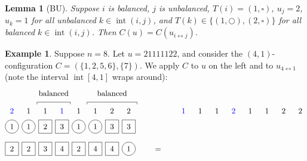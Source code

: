 \documentclass[submission]{FPSAC2018}
\DeclareMathOperator{\inter}{int} %
\theoremstyle{plain}
\newtheorem{lemma}[thm]{Lemma}
\theoremstyle{definition}
\newtheorem{example}[thm]{Example}
\numberwithin{equation}{section}
\begin{document}
\begin{lemma}[BU]
\label{le:BU}
  Suppose $i$ is balanced, $j$ is unbalanced, $T(i) = (1,\square)$, $u_j = 2$, $u_k = 1$ for all unbalanced $k \in \inter (i,j)$, and $T(k) \in \{(1,\bigcirc),(2,\square)\}$ for all balanced $k \in \inter(i,j)$.
  Then $C(u) = C(u_{i \leftrightarrow j})$.
 \end{lemma}
 
\begin{example}
Suppose $n = 8$.
Let $u = 21111122$, and consider the $(4,1)$-configuration $C = (\{1,2,5,6\},\{7\})$.
We apply $C$ to $u$ on the left and to $u_{4\leftrightarrow1}$ (note the interval $\inter[4,1]$ wraps around):
\[
\begin{tikzpicture}[baseline=25]
  \def\sc{0.75}   %
  \def\lll{2.7}   %
  \def\ll{2}   %
  \def\l{1}   %
  \node[color=blue] at (1*\sc,\lll) {$2$};
  \node[color=blue] at (4*\sc,\lll) {$1$};
  \foreach \i in {2,3,5,6} { \node at (\i*\sc,\lll){$1$}; }
  \foreach \i in {7,8} { \node at (\i*\sc,\lll){$2$}; }
  \foreach \i in {1,2,5,6} { \draw (\i*\sc,\ll) circle (0.3); }
  \foreach \i in {3,4,7,8} { \draw (\i*\sc-.3,\ll-.3) rectangle +(0.6,+0.6); }
  \foreach \i in {1,2,5,6} { \node at (\i*\sc,\ll) {$1$}; }
  \foreach \i in {3} { \node at (\i*\sc,\ll) {$2$}; }
  \foreach \i in {4,7,8} { \node at (\i*\sc,\ll) {$3$}; }
  \foreach \i in {8} { \draw (\i*\sc,\l) circle (0.3); }
  \foreach \i in {1,2,3,4,5,6,7} { \draw (\i*\sc-.3,\l-.3) rectangle +(0.6,+0.6); }
  \foreach \i in {4,6,7} { \node at (\i*\sc,\l) {$4$}; }
  \foreach \i in {8} { \node at (\i*\sc,\l) {$1$}; }
  \foreach \i in {3} { \node at (\i*\sc,\l) {$3$}; }
  \foreach \i in {1,2,5} { \node at (\i*\sc,\l) {$2$}; }
  \draw (2.5*\sc,3) -- (2.5*\sc,3.1) -- (4.5*\sc,3.1) -- (4.5*\sc,3);
  \node at (3.5*\sc,3.5) {balanced};
  \draw (5.5*\sc,3) -- (5.5*\sc,3.1) -- (8.5*\sc,3.1) -- (8.5*\sc,3);
  \node at (7.0*\sc,3.5) {balanced};
\end{tikzpicture}
\hspace{20pt} = \hspace{20pt}
\begin{tikzpicture}[baseline=25]
  \def\sc{0.75}   %
  \def\lll{2.7}   %
  \def\ll{2}   %
  \def\l{1}   %
  \node[color=blue] at (4*\sc,\lll) {$2$};
  \node[color=blue] at (1*\sc,\lll) {$1$};
  \foreach \i in {2,3,5,6} { \node at (\i*\sc,\lll){$1$}; }
  \foreach \i in {7,8} { \node at (\i*\sc,\lll){$2$}; }

\end{tikzpicture}\]
\end{example}
\end{document}
